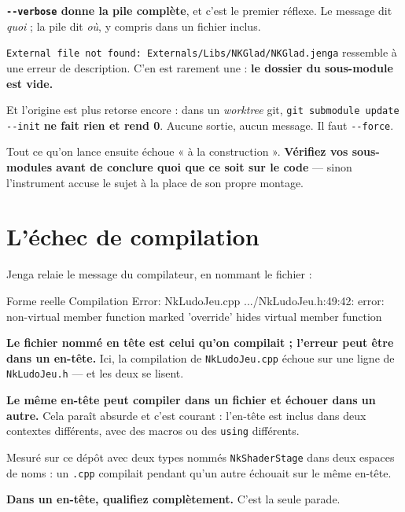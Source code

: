 \begin{nkretenir}
\textbf{\texttt{-{}-verbose} donne la pile complète}, et c'est le premier réflexe.
Le message dit \emph{quoi} ; la pile dit \emph{où}, y compris dans un fichier
inclus.
\end{nkretenir}

\begin{nkpiege}
\texttt{External file not found: Externals/Libs/NKGlad/NKGlad.jenga} ressemble à
une erreur de description. C'en est rarement une : \textbf{le dossier du
sous-module est vide.}

Et l'origine est plus retorse encore : dans un \emph{worktree} git,
\texttt{git submodule update -{}-init} \textbf{ne fait rien et rend 0}. Aucune
sortie, aucun message. Il faut \texttt{-{}-force}.

Tout ce qu'on lance ensuite échoue « à la construction ». \textbf{Vérifiez vos
sous-modules avant de conclure quoi que ce soit sur le code} --- sinon
l'instrument accuse le sujet à la place de son propre montage.
\end{nkpiege}

\section{L'échec de compilation}

\begin{nkretenir}
Jenga relaie le message du compilateur, en nommant le fichier :

\begin{nkcode}{Forme reelle}
Compilation Error: NkLudoJeu.cpp
  .../NkLudoJeu.h:49:42: error: non-virtual member function marked
  'override' hides virtual member function
\end{nkcode}

\textbf{Le fichier nommé en tête est celui qu'on compilait ; l'erreur peut être
dans un en-tête.} Ici, la compilation de \texttt{NkLudoJeu.cpp} échoue sur une
ligne de \texttt{NkLudoJeu.h} --- et les deux se lisent.
\end{nkretenir}

\begin{nkpiege}
\textbf{Le même en-tête peut compiler dans un fichier et échouer dans un autre.}
Cela paraît absurde et c'est courant : l'en-tête est inclus dans deux contextes
différents, avec des macros ou des \texttt{using} différents.

Mesuré sur ce dépôt avec deux types nommés \texttt{NkShaderStage} dans deux
espaces de noms : un \texttt{.cpp} compilait pendant qu'un autre échouait sur le
même en-tête.

\textbf{Dans un en-tête, qualifiez complètement.} C'est la seule parade.
\end{nkpiege}

